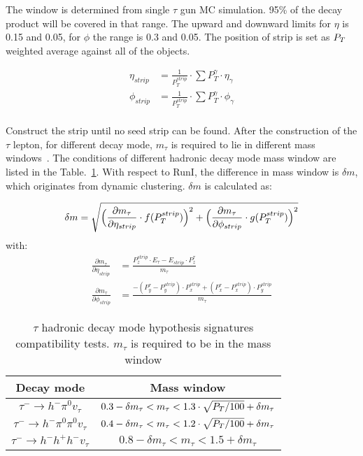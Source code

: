 The window is determined from single $\tau$ gun MC simulation. 95\% of the decay product will be covered in that range. The upward and downward limits for $\eta$ is 0.15 and 0.05, for $\phi$ the range is 0.3 and 0.05.  The position of strip is set as $P_{T}$ weighted average against all of the objects. 

\begin{align*}
\eta_{strip}&=\frac{1}{P_{T}^{strip}}\cdot\sum P_{T}^{\gamma}\cdot\eta_{\gamma}\\
\phi_{strip}&=\frac{1}{P_{T}^{strip}}\cdot\sum P_{T}^{\gamma}\cdot\phi_{\gamma}\\
\end{align*}

Construct the strip until no seed strip can be found. After the construction of the $\tau$ lepton, for different decay mode, $m_{\tau}$ is required to lie in different mass windows~\cite{TauReconstuction}.  The conditions of different hadronic decay mode mass window are listed in the Table.~\ref{tb:tauHdecayRecomass}. With respect to RunI, the difference in mass window is $\delta m$, which originates from dynamic clustering. $\delta m$ is calculated as:

\begin{align*}
\delta m&=\sqrt{\Big(\frac{\partial m_{\tau}}{\partial \eta_{strip}}\cdot f(P_{T}^{strip})\Big)^{2}+\Big(\frac{\partial m_{\tau}}{\partial \phi_{strip}}\cdot g(P_{T}^{strip})\Big)^{2}}\\
\end{align*}
with:
\begin{align*}
\frac{\partial m_{\tau}}{\partial\eta_{strip}}&=\frac{P_{z}^{strip}\cdot E_{\tau}-E_{strip}\cdot P_{z}^{\tau}}{m_{\tau}}\\
\frac{\partial m_{\tau}}{\partial\phi_{strip}}&=\frac{-(P_{y}^{\tau}-P_{y}^{strip})\cdot P_{x}^{strip}+(P_{x}^{\tau}-P_{x}^{strip})\cdot P_{y}^{strip}}{m_{\tau}}
\end{align*}


\begin{table}[htp]
\caption{$\tau$ hadronic decay mode hypothesis signatures compatibility tests. $m_{\tau}$ is required to be in the mass window }\label{tb:tauHdecayRecomass}
\begin{center}
\begin{tabular}{|c|c|}
\hline
Decay mode                                             & Mass window\\\hline
$\tau^{-}\to h^{-}\pi^{0} v_{\tau}$                       & $0.3-\delta m_{\tau}<m_{\tau}<1.3\cdot \sqrt{P_{T}/100}+\delta m_{\tau}$      \\\hline
$\tau^{-}\to h^{-}\pi^{0} \pi^{0}  v_{\tau}$       &  $0.4-\delta m_{\tau}<m_{\tau}<1.2\cdot \sqrt{P_{T}/100}+\delta m_{\tau}$   \\\hline
$\tau^{-}\to h^{-}h^{+}h^{-}v_{\tau}$                     & $0.8-\delta m_{\tau}<m_{\tau}<1.5+\delta m_{\tau}$   \\\hline
 \end{tabular}
\end{center}
\end{table}

